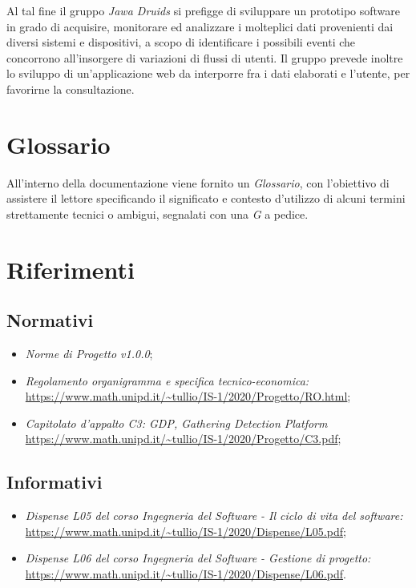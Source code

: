 Al tal fine il gruppo \textit{Jawa Druids} si prefigge di sviluppare un prototipo software in grado di acquisire, monitorare ed analizzare i molteplici dati provenienti dai diversi sistemi e dispositivi, a scopo di identificare i possibili eventi che concorrono all’insorgere di variazioni di flussi di utenti. Il gruppo prevede inoltre lo sviluppo di un'applicazione web da interporre fra i dati elaborati e l'utente, per favorirne la consultazione.

\section{Glossario}\label{IntroduzioneGlossario}

All'interno della documentazione viene fornito un \textit{Glossario}, con l'obiettivo di assistere il lettore specificando il significato e contesto d'utilizzo di alcuni termini strettamente tecnici o ambigui, segnalati con una \textit{G} a pedice.

\section{Riferimenti} \label{IntroduzioneRiferimenti}
\subsection{Normativi} \label{IntroduzioneRiferimentiNormativi}
\begin{itemize}
	\item \textit{Norme di Progetto v1.0.0};
	\item \textit{Regolamento organigramma e specifica tecnico-economica:} \\
	\url{https://www.math.unipd.it/~tullio/IS-1/2020/Progetto/RO.html};
	\item \textit{Capitolato d'appalto C3: GDP, Gathering Detection Platform}\\
	\url{https://www.math.unipd.it/~tullio/IS-1/2020/Progetto/C3.pdf};
\end{itemize}
\subsection{Informativi} \label{IntroduzioneRiferimentiInformativi}
\begin{itemize}
	\item \textit{Dispense L05 del corso Ingegneria del Software - Il ciclo di vita del software:}\\
	\url{https://www.math.unipd.it/~tullio/IS-1/2020/Dispense/L05.pdf};
	\item \textit{Dispense L06 del corso Ingegneria del Software - Gestione di progetto:} \\
	\url{https://www.math.unipd.it/~tullio/IS-1/2020/Dispense/L06.pdf}.
\end{itemize}

